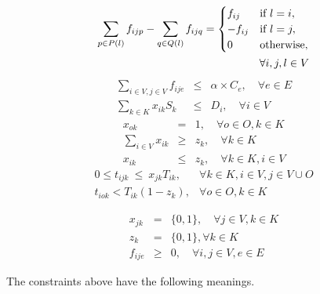 {%
\begin{eqnarray}
 \sum_{p \in P(l)} f_{ijp} - \sum_{q \in Q(l)}  f_{ijq}  =  \begin{cases}  f_{ij} & \text{if } l=i,  \notag \\
   -f_{ij}  &   \text{if } l=j,  \notag \\
0 & \text{otherwise}, \end{cases}\\
\forall i,j,l \in V  \label{eq:flow3}
\end{eqnarray}
\begin{eqnarray}
 \sum_{i \in V, j \in V} f_{ije} &\leq& \alpha \times C_e, \quad \forall e \in E \label{eq:mlu4} \\
 \sum_{k \in K}  x_{ik}S_k &\leq& D_i , \quad \forall i \in V \label{eq:disk5}
\end{eqnarray}
\begin{eqnarray}
x_{ok} &=& 1, \quad \forall o \in O,   k \in K \label{eq:disk501}\\
\sum_{i \in V}  x_{ik} &\geq& z_k, \quad \forall k \in K  \label{eq:disk6}\\
x_{ik} &\leq& z_k, \quad \forall k \in K, i \in V  \label{eq:disk601}
\end{eqnarray}
\begin{eqnarray}
0 \leq t_{ijk} \ \leq\  x_{jk} T_{ik}, & \forall k \in K,  i \in V, j \in V \cup O   \label{eq:flow7}\\
t_{iok} < T_{ik}(1 - z_k), & \forall o \in O,  k \in K   \label{eq:flow8}
\end{eqnarray}

\begin{eqnarray*}
x_{jk} &=& \{0,1\}, \quad \forall j \in V, k \in K\\
z_{k} &=& \{0,1 \}, \forall k \in K\\
f_{ije} &\geq& 0, \quad \forall  i,j \in V, e \in E
\end{eqnarray*}



The constraints above have the following meanings.

}

